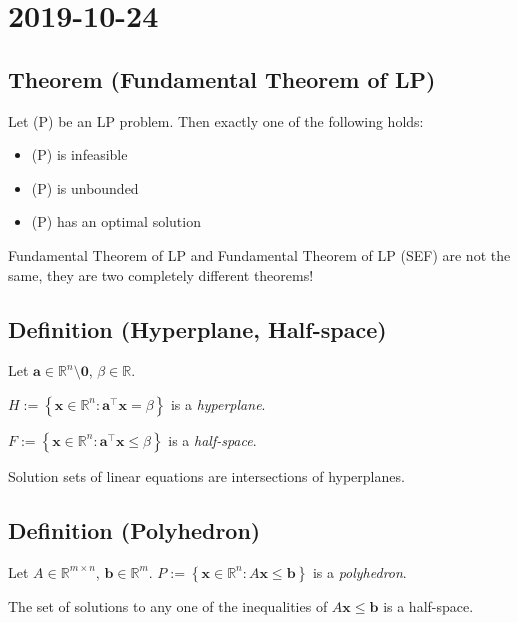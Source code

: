 \section{2019-10-24}
\begin{thmbox}
    \subsection{Theorem (Fundamental Theorem of LP)}
    Let (P) be an LP problem. Then exactly one of the following holds:
    \begin{itemize}
        \item (P) is infeasible
        \item (P) is unbounded
        \item (P) has an optimal solution
    \end{itemize}
\end{thmbox}
\begin{remark}
    Fundamental Theorem of LP and Fundamental Theorem of LP (SEF) are not
    the same, they are two completely different theorems!
\end{remark}

\begin{defbox}
    \subsection{Definition (Hyperplane, Half-space)}
    Let $ \bm{a} \in \mathbb{R}^n\setminus{\bm{0}} $, $ \beta \in\mathbb{R} $.

    $ H:=\left\{\bm{x}\in\mathbb{R}^n:
    \bm{a} ^\top \bm{x}=\beta \right\} $ is a \emph{hyperplane}.

    $ F:=\left\{\bm{x}\in\mathbb{R}^n:
    \bm{a} ^\top \bm{x}\le \beta\right\} $ is a \emph{half-space}.
\end{defbox}

Solution sets of linear equations are intersections of hyperplanes.

\begin{defbox}
    \subsection{Definition (Polyhedron)}
    Let $ A\in \mathbb{R}^{m \times n} $, $ \bm{b}\in \mathbb{R}^m $.
    $ P:=\left\{\bm{x}\in\mathbb{R}^n:A\bm{x}\le \bm{b}\right\} $ is a \emph{polyhedron}.
\end{defbox}
\begin{remark}
    The set of solutions to any one of the inequalities of 
    $ A\bm{x}\le \bm{b} $ is a half-space.
\end{remark}

